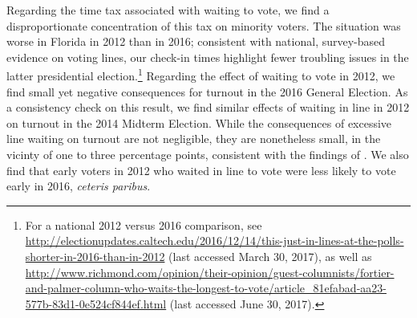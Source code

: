 \documentclass[12pt,titlepage]{article}
\begin{document}



Regarding the time tax associated with waiting to vote, we find a
disproportionate concentration of this tax on minority voters. The
situation was worse in Florida in 2012 than in 2016; consistent with
national, survey-based evidence on voting lines, our check-in times
highlight fewer troubling issues in the latter presidential
election.\footnote{For a national 2012 versus 2016 comparison, see
  \url{http://electionupdates.caltech.edu/2016/12/14/this-just-in-lines-at-the-polls-shorter-in-2016-than-in-2012}
  (last accessed March 30, 2017), as well as
  \url{http://www.richmond.com/opinion/their-opinion/guest-columnists/fortier-and-palmer-column-who-waits-the-longest-to-vote/article_81efabad-aa23-577b-83d1-0e524cf844ef.html}
  (last accessed June 30, 2017).} Regarding the effect of waiting to
vote in 2012, we find small yet negative consequences for turnout in
the 2016 General Election. As a consistency check on this result, we
find similar effects of waiting in line in 2012 on turnout in the 2014
Midterm Election. While the consequences of excessive line waiting on
turnout are not negligible, they are nonetheless small, in the vicinty
of one to three percentage points, consistent with the findings of
\citet{pettigrew:longlinesminorityprecincts}. We also find that early
voters in 2012 who waited in line to vote were less likely to vote
early in 2016, \emph{ceteris paribus}.
\end{document}
